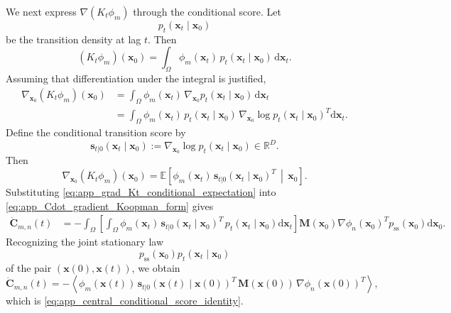 \documentclass[11pt,twoside,fleqn]{article}
\renewcommand{\d}{\mathrm{d}}
\begin{document}
We next express $\nabla(K_t\phi_m)$ through the conditional score. Let
\begin{equation}
    p_t(\bm{x}_t\mid\bm{x}_0)
\end{equation}
be the transition density at lag $t$. Then
\begin{equation}
    (K_t\phi_m)(\bm{x}_0)
    =
    \int_\Omega
        \phi_m(\bm{x}_t)\,
        p_t(\bm{x}_t\mid\bm{x}_0)\,
        \d\bm{x}_t .
    \label{eq:app_Kt_transition_density}
\end{equation}
Assuming that differentiation under the integral is justified,
\begin{equation}
\begin{aligned}
    \nabla_{\bm{x}_0}(K_t\phi_m)(\bm{x}_0)
    &=
    \int_\Omega
        \phi_m(\bm{x}_t)\,
        \nabla_{\bm{x}_0}p_t(\bm{x}_t\mid\bm{x}_0)\,
        \d\bm{x}_t \\
    &=
    \int_\Omega
        \phi_m(\bm{x}_t)\,
        p_t(\bm{x}_t\mid\bm{x}_0)\,
        \nabla_{\bm{x}_0}
        \log p_t(\bm{x}_t\mid\bm{x}_0)^T
        \d\bm{x}_t .
\end{aligned}
\label{eq:app_grad_Kt_transition_score}
\end{equation}
Define the conditional transition score by
\begin{equation}
    \bm{s}_{t|0}(\bm{x}_t\mid\bm{x}_0)
    :=
    \nabla_{\bm{x}_0}
    \log p_t(\bm{x}_t\mid\bm{x}_0)
    \in\mathbb{R}^{D}.
    \label{eq:app_conditional_score_definition}
\end{equation}
Then
\begin{equation}
    \nabla_{\bm{x}_0}(K_t\phi_m)(\bm{x}_0)
    =
    \mathbb{E}
    \left[
        \phi_m(\bm{x}_t)\,
        \bm{s}_{t|0}(\bm{x}_t\mid\bm{x}_0)^T
        \,\middle|\,
        \bm{x}_0
    \right].
    \label{eq:app_grad_Kt_conditional_expectation}
\end{equation}
Substituting \eqref{eq:app_grad_Kt_conditional_expectation} into
\eqref{eq:app_Cdot_gradient_Koopman_form} gives
\begin{equation}
\begin{aligned}
    \dot{\bm{C}}_{m,n}(t)
    &=
    -
    \int_\Omega
    \left[
        \int_\Omega
            \phi_m(\bm{x}_t)\,
            \bm{s}_{t|0}(\bm{x}_t\mid\bm{x}_0)^T\,
            p_t(\bm{x}_t\mid\bm{x}_0)
            \d\bm{x}_t
    \right]
    \bm{M}(\bm{x}_0)
    \nabla\phi_n(\bm{x}_0)^T
    p_{\mathrm{ss}}(\bm{x}_0)
    \d\bm{x}_0 .
\end{aligned}
\label{eq:app_substitute_conditional_score}
\end{equation}
Recognizing the joint stationary law
\begin{equation}
    p_{\mathrm{ss}}(\bm{x}_0)
    p_t(\bm{x}_t\mid\bm{x}_0)
\end{equation}
of the pair $(\bm{x}(0),\bm{x}(t))$, we obtain
\begin{equation}
    \dot{\bm{C}}_{m,n}(t)
    =
    -
    \left\langle
        \phi_m(\bm{x}(t))\,
        \bm{s}_{t|0}(\bm{x}(t)\mid \bm{x}(0))^T\,
        \bm{M}(\bm{x}(0))\,
        \nabla\phi_n(\bm{x}(0))^T
    \right\rangle ,
    \label{eq:app_final_conditional_score_identity}
\end{equation}
which is \eqref{eq:app_central_conditional_score_identity}.
\end{document}
